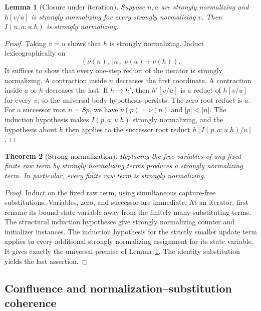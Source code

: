 \documentclass[11pt,a4paper]{article}
\newtheorem{theorem}{Theorem}[section]
\newtheorem{lemma}[theorem]{Lemma}
\theoremstyle{definition}\newtheorem{definition}[theorem]{Definition}
\theoremstyle{remark}\newtheorem{remark}[theorem]{Remark}
\begin{document}
\begin{lemma}[Closure under iteration]
\label{lem:nb-iterator}
Suppose $n,a$ are strongly normalizing and $h[v/u]$ is strongly normalizing
for every strongly normalizing $v$. Then $I(n,a;u.h)$ is strongly
normalizing.
\end{lemma}
\begin{proof}
Taking $v=u$ shows that $h$ is strongly normalizing. Induct
lexicographically on
\[
            (\nu(n),\ |n|,\ \nu(a)+\nu(h)).
\]
It suffices to show that every one-step reduct of the iterator is strongly
normalizing. A contraction inside $n$ decreases the first coordinate.
A contraction inside $a$ or $h$ decreases the last. If $h\to h'$, then
$h'[v/u]$ is a reduct of $h[v/u]$ for every $v$, so the universal body
hypothesis persists. The zero root reduct is $a$. For a successor root
$n=Sp$, we have $\nu(p)=\nu(n)$ and $|p|<|n|$. The induction hypothesis
makes $I(p,a;u.h)$ strongly normalizing, and the hypothesis about $h$
then applies to the successor root reduct
$h[I(p,a;u.h)/u]$.
\end{proof}

\begin{theorem}[Strong normalization]
\label{thm:nb-sn}
Replacing the free variables of any fixed finite raw term by strongly
normalizing terms produces a strongly normalizing term. In particular,
every finite raw term is strongly normalizing.
\end{theorem}
\begin{proof}
Induct on the fixed raw term, using simultaneous capture-free substitutions.
Variables, zero, and successor are immediate. At an iterator, first rename
its bound state variable away from the finitely many substituting terms.
The structural induction hypotheses give strongly normalizing counter and
initializer instances. The induction hypothesis for the strictly smaller
update term applies to every additional strongly normalizing assignment
for its state variable. It gives exactly the universal premise of
Lemma~\ref{lem:nb-iterator}. The identity substitution yields the last
assertion.
\end{proof}

\subsection{Confluence and normalization--substitution coherence}
\end{document}

